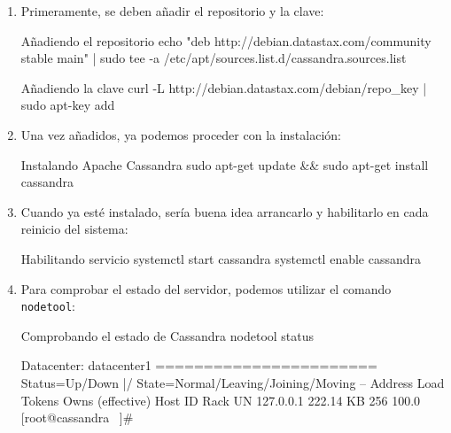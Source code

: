 \begin{enumerate}
  \item Primeramente, se deben añadir el repositorio y la clave:
    \begin{TMterminal}{}{}{Añadiendo el repositorio}
      echo "deb http://debian.datastax.com/community stable main" | sudo tee -a /etc/apt/sources.list.d/cassandra.sources.list
    \end{TMterminal}

    \begin{TMterminal}{}{}{Añadiendo la clave}
      curl -L http://debian.datastax.com/debian/repo_key | sudo apt-key add
    \end{TMterminal}

  \item Una vez añadidos, ya podemos proceder con la instalación:
    \begin{TMterminal}{}{}{Instalando Apache Cassandra }
      sudo apt-get update && sudo apt-get install cassandra 
    \end{TMterminal}

  \item Cuando ya esté instalado, sería buena idea arrancarlo y habilitarlo en
    cada reinicio del sistema:
    \begin{TMterminal}{}{}{Habilitando servicio}
      systemctl start cassandra
      systemctl enable cassandra
    \end{TMterminal}

  \item Para comprobar el estado del servidor, podemos utilizar el comando
    \texttt{nodetool}:
    \begin{TMterminal}{}{}{Comprobando el estado de Cassandra}
      nodetool status

      Datacenter: datacenter1
      =======================
      Status=Up/Down
      |/ State=Normal/Leaving/Joining/Moving
      -- Address Load Tokens Owns (effective) Host ID Rack
      UN 127.0.0.1 222.14 KB 256 100.0%
      [root@cassandra ~]#

    \end{TMterminal}
    

\end{enumerate}



